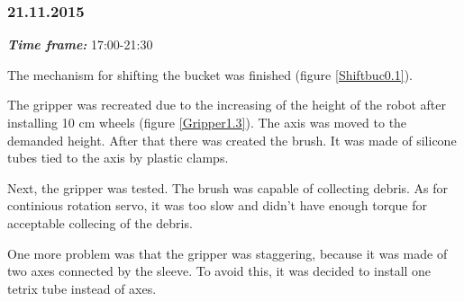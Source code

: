 \subsubsection{21.11.2015}
\textit{\textbf{Time frame:}} 17:00-21:30

The mechanism for shifting the bucket was finished (figure \ref{Shiftbuc0.1}). 

The gripper was recreated due to the increasing of the height of the robot after installing 10 cm wheels (figure \ref{Gripper1.3}). The axis was moved to the demanded height. After that there was created the brush. It was made of silicone tubes tied to the axis by plastic clamps. 

Next, the gripper was tested. The brush was capable of collecting debris. As for continious rotation servo, it was too slow and didn't have enough torque for acceptable collecing of the debris. 

One more problem was that the gripper was staggering, because it was made of two axes connected by the sleeve. To avoid this, it was decided to install one tetrix tube instead of axes.

